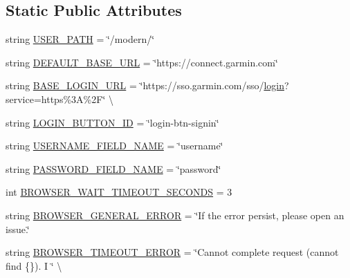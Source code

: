 \subsection*{Static Public Attributes}
\begin{DoxyCompactItemize}
\item 
string \hyperlink{classpygce_1_1models_1_1bot_1_1_garmin_connect_bot_aa0d174bafc498e1c037324e16fd0dbe0}{U\+S\+E\+R\+\_\+\+P\+A\+TH} = \char`\"{}/modern/\char`\"{}
\item 
string \hyperlink{classpygce_1_1models_1_1bot_1_1_garmin_connect_bot_a860621296516b8e3793321d0773e30f3}{D\+E\+F\+A\+U\+L\+T\+\_\+\+B\+A\+S\+E\+\_\+\+U\+RL} = \char`\"{}https\+://connect.\+garmin.\+com\char`\"{}
\item 
string \hyperlink{classpygce_1_1models_1_1bot_1_1_garmin_connect_bot_aad154f2121928191c68ac2f9530470e3}{B\+A\+S\+E\+\_\+\+L\+O\+G\+I\+N\+\_\+\+U\+RL} = \char`\"{}https\+://sso.\+garmin.\+com/sso/\hyperlink{classpygce_1_1models_1_1bot_1_1_garmin_connect_bot_a31c8153cff1e4c2ce2a66d3b3aada3f1}{login}?service=https\%3\+A\%2\+F\char`\"{} \textbackslash{}
\item 
string \hyperlink{classpygce_1_1models_1_1bot_1_1_garmin_connect_bot_a792c3468032c4154b334cacfb30a871f}{L\+O\+G\+I\+N\+\_\+\+B\+U\+T\+T\+O\+N\+\_\+\+ID} = \char`\"{}login-\/btn-\/signin\char`\"{}
\item 
string \hyperlink{classpygce_1_1models_1_1bot_1_1_garmin_connect_bot_a0128de4e9df3cd9171f697709b634865}{U\+S\+E\+R\+N\+A\+M\+E\+\_\+\+F\+I\+E\+L\+D\+\_\+\+N\+A\+ME} = \char`\"{}username\char`\"{}
\item 
string \hyperlink{classpygce_1_1models_1_1bot_1_1_garmin_connect_bot_aa5839cf18d60997c81245cebea3eb307}{P\+A\+S\+S\+W\+O\+R\+D\+\_\+\+F\+I\+E\+L\+D\+\_\+\+N\+A\+ME} = \char`\"{}password\char`\"{}
\item 
int \hyperlink{classpygce_1_1models_1_1bot_1_1_garmin_connect_bot_a71d72a5424537d2a39e05e75f654697e}{B\+R\+O\+W\+S\+E\+R\+\_\+\+W\+A\+I\+T\+\_\+\+T\+I\+M\+E\+O\+U\+T\+\_\+\+S\+E\+C\+O\+N\+DS} = 3
\item 
string \hyperlink{classpygce_1_1models_1_1bot_1_1_garmin_connect_bot_afb55db5c02bec7ec7493dacdd65b31d7}{B\+R\+O\+W\+S\+E\+R\+\_\+\+G\+E\+N\+E\+R\+A\+L\+\_\+\+E\+R\+R\+OR} = \char`\"{}If the error persist, please open an issue.\char`\"{}
\item 
string \hyperlink{classpygce_1_1models_1_1bot_1_1_garmin_connect_bot_ad2a1e0946d0f6325bb4fdd8564fe7665}{B\+R\+O\+W\+S\+E\+R\+\_\+\+T\+I\+M\+E\+O\+U\+T\+\_\+\+E\+R\+R\+OR} = \char`\"{}Cannot complete request (cannot find \{\}). I \char`\"{} \textbackslash{}
\end{DoxyCompactItemize}


